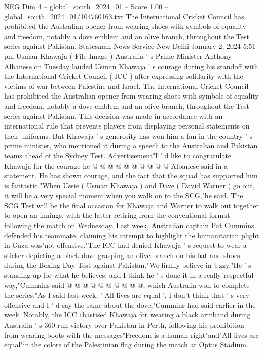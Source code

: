 \begin{textsample}{NEG Dim 4 – global\_south\_2024\_01 – Score 1.00 – global\_south\_2024\_01/104760163.txt}  \label{ex:f4_neg_086}
The International Cricket Council has prohibited the Australian opener from wearing shoes with symbols of equality and freedom, notably a dove emblem and an olive branch, throughout the Test series against Pakistan.
Statesman News Service New Delhi January 2, 2024 5:51 pm Usman Khawaja ( File Image ) Australia ' s Prime Minister Anthony Albanese on Tuesday lauded Usman Khawaja ' s courage during his standoff with the International Cricket Council ( ICC ) after expressing solidarity with the victims of war between Palestine and Israel.
The International Cricket Council has prohibited the Australian opener from wearing shoes with symbols of equality and freedom, notably a dove emblem and an olive branch, throughout the Test series against Pakistan.
This decision was made in accordance with an international rule that prevents players from displaying personal statements on their uniforms.
But Khawaja ' s generosity has won him a fan in the country ' s prime minister, who mentioned it during a speech to the Australian and Pakistan teams ahead of the Sydney Test.
Advertisement"I ' d like to congratulate Khawaja for the courage he @ @ @ @ @ @ @ @ @ @ Albanese said in a statement.
He has shown courage, and the fact that the squad has supported him is fantastic."When Ussie ( Usman Khawaja ) and Dave ( David Warner ) go out, it will be a very special moment when you walk on to the SCG,"he said.
The SCG Test will be the final occasion for Khawaja and Warner to walk out together to open an innings, with the latter retiring from the conventional format following the match on Wednesday.
Last week, Australian captain Pat Cummins defended his teammate, claiming his attempt to highlight the humanitarian plight in Gaza was"not offensive."The ICC had denied Khawaja ' s request to wear a sticker depicting a black dove grasping an olive branch on his bat and shoes during the Boxing Day Test against Pakistan."We firmly believe in Uzzy."He ' s standing up for what he believes, and I think he ' s done it in a really respectful way,"Cummins said @ @ @ @ @ @ @ @ @ @, which Australia won to complete the series."As I said last week, ' All lives are equal ', I don't think that ' s very offensive and I ' d say the same about the dove,"Cummins had said earlier in the week.
Notably, the ICC chastised Khawaja for wearing a black armband during Australia ' s 360-run victory over Pakistan in Perth, following his prohibition from wearing boots with the messages"Freedom is a human right"and"All lives are equal"in the colors of the Palestinian flag during the match at Optus Stadium.

\end{textsample}
